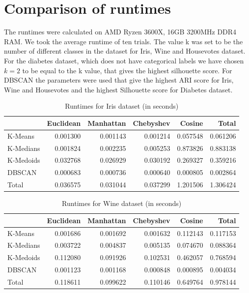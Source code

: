 \section{Comparison of runtimes}
The runtimes were calculated on AMD Ryzen 3600X, 16GB 3200MHz DDR4 RAM. We took the average runtime of ten trials. The value k was set to be the number of different classes in the dataset for Iris, Wine and Housevotes dataset. For the diabetes dataset, which does not have categorical labels we have chosen $k=2$ to be equal to the k value, that gives the highest silhouette score. For DBSCAN the parameters were used that give the highest ARI score for Iris, Wine and Housevotes and the highest Silhouette score for Diabetes dataset. \\

\begin{table}[H]
	\begin{tabular}{lrrrr|r}
		\toprule
		{} &  Euclidean &  Manhattan &  Chebyshev &    Cosine &     Total \\
		\midrule
		K-Means   &   0.001300 &   0.001143 &   0.001214 &  0.057548 &  0.061206 \\
		K-Medians &   0.001824 &   0.002235 &   0.005253 &  0.873826 &  0.883138 \\
		K-Medoids &   0.032768 &   0.026929 &   0.030192 &  0.269327 &  0.359216 \\
		DBSCAN    &   0.000683 &   0.000736 &   0.000640 &  0.000805 &  0.002864 \\
		\midrule
		Total     &   0.036575 &   0.031044 &   0.037299 &  1.201506 &  1.306424 \\
		\bottomrule
		
	\end{tabular}
	\caption{Runtimes for Iris dataset (in seconds)}
\end{table}


\begin{table}[H]
	\begin{tabular}{lrrrr|r}
		\toprule
		{} &  Euclidean &  Manhattan &  Chebyshev &    Cosine &     Total \\
		\midrule
		K-Means   &   0.001686 &   0.001692 &   0.001632 &  0.112143 &  0.117153 \\
		K-Medians &   0.003722 &   0.004837 &   0.005135 &  0.074670 &  0.088364 \\
		K-Medoids &   0.112080 &   0.091926 &   0.102531 &  0.462057 &  0.768594 \\
		DBSCAN    &   0.001123 &   0.001168 &   0.000848 &  0.000895 &  0.004034 \\
		\midrule
		Total     &   0.118611 &   0.099622 &   0.110146 &  0.649764 &  0.978144 \\
		\bottomrule
		
	\end{tabular} 
	\caption{Runtimes for Wine dataset (in seconds)}
\end{table}


